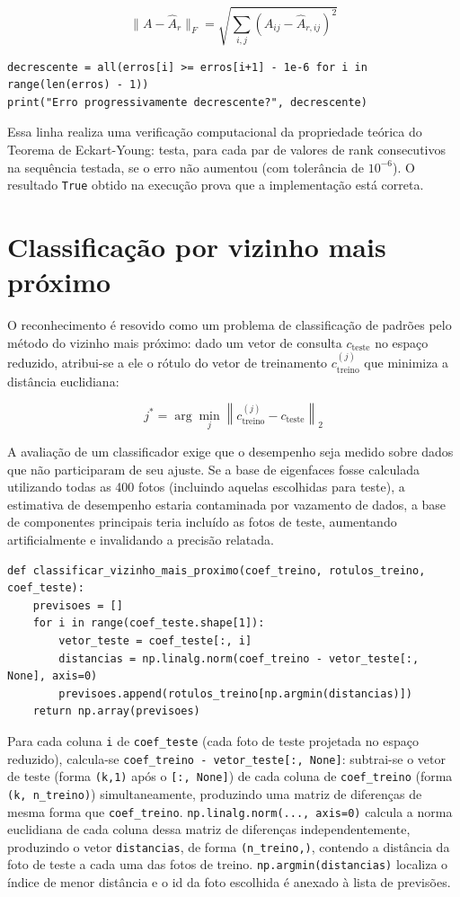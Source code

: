 \documentclass[12pt,a4paper]{article}
\begin{document}
$$\|A - \hat A_r\|_F = \sqrt{\sum_{i,j}(A_{ij}-\hat A_{r,ij})^2}$$

\begin{lstlisting}
decrescente = all(erros[i] >= erros[i+1] - 1e-6 for i in range(len(erros) - 1))
print("Erro progressivamente decrescente?", decrescente)
\end{lstlisting}

Essa linha realiza uma verificação computacional da propriedade
teórica do Teorema de Eckart-Young: testa, para cada par de valores
de rank consecutivos na sequência testada, se o erro não aumentou (com tolerância de
$10^{-6}$). O resultado \texttt{True} obtido na
execução prova que a implementação está
correta.

\section{Classificação por vizinho mais próximo}

O reconhecimento é resovido como um problema de classificação de padrões pelo método do vizinho mais próximo: dado um vetor de consulta $c_{\text{teste}}$ no espaço
reduzido, atribui-se a ele o rótulo do vetor de treinamento $c_{\text{treino}}^{(j)}$
que minimiza a distância euclidiana:

$$j^* = \arg\min_j \left\| c_{\text{treino}}^{(j)} - c_{\text{teste}} \right\|_2$$

A avaliação de um classificador exige que o desempenho seja medido sobre dados que não participaram de
seu ajuste. Se a base de eigenfaces fosse calculada utilizando todas as 400
fotos (incluindo aquelas escolhidas para teste), a estimativa de desempenho estaria
contaminada por vazamento de dados, a base de componentes
principais teria incluído as fotos de teste, aumentando artificialmente e invalidando a precisão relatada.

\begin{lstlisting}
def classificar_vizinho_mais_proximo(coef_treino, rotulos_treino, coef_teste):
    previsoes = []
    for i in range(coef_teste.shape[1]):
        vetor_teste = coef_teste[:, i]
        distancias = np.linalg.norm(coef_treino - vetor_teste[:, None], axis=0)
        previsoes.append(rotulos_treino[np.argmin(distancias)])
    return np.array(previsoes)
\end{lstlisting}

Para cada coluna \texttt{i} de \texttt{coef\_teste} (cada foto de teste projetada no espaço
reduzido), calcula-se \texttt{coef\_treino - vetor\_teste[:, None]}: 
subtrai-se o vetor de teste (forma \texttt{(k,1)} após o \texttt{[:, None]}) de cada coluna de
\texttt{coef\_treino} (forma \texttt{(k, n\_treino)}) simultaneamente, produzindo uma matriz de
diferenças de mesma forma que \texttt{coef\_treino}. \texttt{np.linalg.norm(..., axis=0)} calcula a
norma euclidiana de cada coluna dessa matriz de diferenças independentemente,
produzindo o vetor \texttt{distancias}, de forma \texttt{(n\_treino,)}, contendo a distância da foto
de teste a cada uma das fotos de treino. \texttt{np.argmin(distancias)} localiza o
índice de menor distância e o id da foto escolhida é anexado à lista de previsões.
\end{document}
